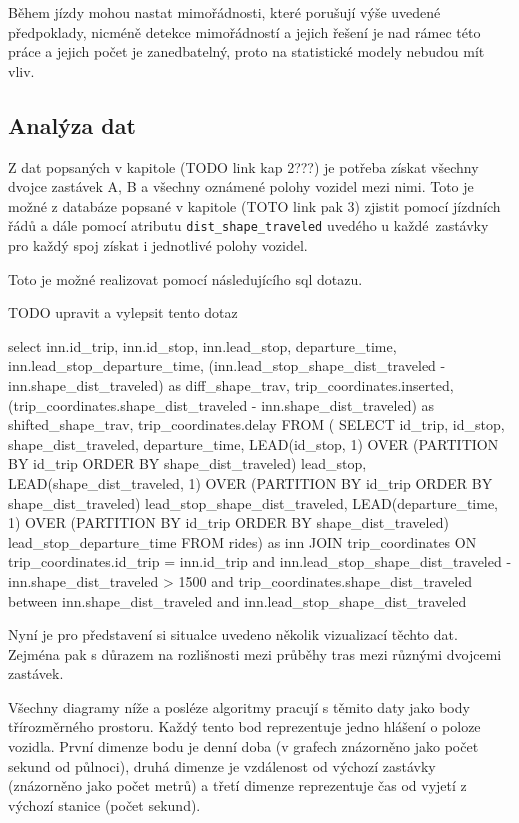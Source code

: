 \bigbreak

Během jízdy mohou nastat mimořádnosti, které porušují výše uvedené předpoklady, nicméně detekce mimořádností a jejich řešení je nad rámec této práce a jejich počet je zanedbatelný, proto na statistické modely nebudou mít vliv.


\subsection{Analýza dat}

Z dat popsaných v kapitole (TODO link kap 2???) je potřeba získat všechny dvojce zastávek A, B a všechny oznámené polohy vozidel mezi nimi. Toto je možné z databáze popsané v kapitole (TOTO link pak 3) zjistit pomocí jízdních řádů a dále pomocí atributu \verb-dist_shape_traveled- uvedého u každé zastávky pro každý spoj získat i jednotlivé polohy vozidel.

\bigbreak

Toto je možné realizovat pomocí následujícího \gls{sql} dotazu.

TODO upravit a vylepsit tento dotaz
\begin{code}[frame=none]
select inn.id_trip,
	inn.id_stop,
	inn.lead_stop,
	departure_time,
	inn.lead_stop_departure_time,
	(inn.lead_stop_shape_dist_traveled - inn.shape_dist_traveled) as diff_shape_trav,
	trip_coordinates.inserted,
	(trip_coordinates.shape_dist_traveled - inn.shape_dist_traveled) as shifted_shape_trav,
	trip_coordinates.delay
FROM (
	SELECT id_trip, id_stop, shape_dist_traveled, departure_time,
		LEAD(id_stop, 1) OVER (PARTITION BY id_trip ORDER BY shape_dist_traveled) lead_stop,
		LEAD(shape_dist_traveled, 1) OVER (PARTITION BY id_trip ORDER BY shape_dist_traveled) lead_stop_shape_dist_traveled,
		LEAD(departure_time, 1) OVER (PARTITION BY id_trip ORDER BY shape_dist_traveled) lead_stop_departure_time
	FROM rides) as inn
	JOIN trip_coordinates
	ON trip_coordinates.id_trip = inn.id_trip and inn.lead_stop_shape_dist_traveled - inn.shape_dist_traveled > 1500 and trip_coordinates.shape_dist_traveled between inn.shape_dist_traveled and inn.lead_stop_shape_dist_traveled
\end{code}

\bigbreak

Nyní je pro představení si situalce uvedeno několik vizualizací těchto dat. Zejména pak s důrazem na rozlišnosti mezi průběhy tras mezi různými dvojcemi zastávek.

\bigbreak

Všechny diagramy níže a posléze algoritmy pracují s těmito daty jako body třírozměrného prostoru. Každý tento bod reprezentuje jedno hlášení o poloze vozidla. První dimenze bodu je denní doba (v grafech znázorněno jako počet sekund od půlnoci), druhá dimenze je vzdálenost od výchozí zastávky (znázorněno jako počet metrů) a třetí dimenze reprezentuje čas od vyjetí z výchozí stanice (počet sekund).

